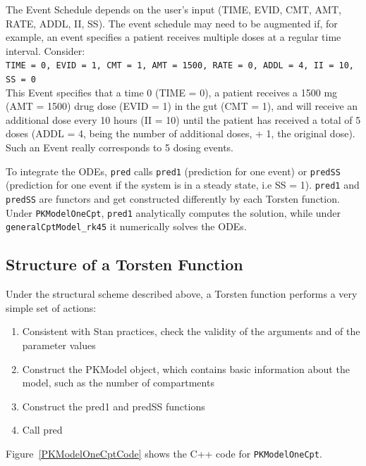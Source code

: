 \documentclass[11pt]{amsart}
\begin{document}
The Event Schedule depends on the user's input (TIME, EVID, CMT, AMT, RATE, ADDL, II, SS). The event schedule may need to be augmented if, for example, an event specifies a patient receives multiple doses at a regular time interval. Consider: \\

\texttt{TIME = 0, EVID = 1, CMT = 1, AMT = 1500, RATE = 0, ADDL = 4, II = 10, SS = 0} \\

This Event specifies that a time 0 (TIME = 0), a patient receives a 1500 mg (AMT = 1500) drug dose (EVID = 1) in the gut (CMT = 1), and will receive an additional dose every 10 hours (II = 10) until the patient has received a total of 5 doses (ADDL = 4, being the number of additional doses, + 1, the original dose). Such an Event really corresponds to 5 dosing events.

To integrate the ODEs, \texttt{pred} calls \texttt{pred1} (prediction for one event) or \texttt{predSS} (prediction for one event if the system is in a steady state, i.e SS = 1). \texttt{pred1} and \texttt{predSS} are functors and get constructed differently by each Torsten function. Under \texttt{PKModelOneCpt}, \texttt{pred1} analytically computes the solution, while under \texttt{generalCptModel\_rk45} it numerically solves the ODEs.
 
\subsection*{Structure of a Torsten Function} 
Under the structural scheme described above, a Torsten function performs a very simple set of actions:
\begin{enumerate}
  \item Consistent with Stan practices, check the validity of the arguments and of the parameter values
  \item Construct the PKModel object, which contains basic information about the model, such as the number of compartments
  \item Construct the pred1 and predSS functions
  \item Call pred
\end{enumerate}  

Figure~\ref{PKModelOneCptCode} shows the C++ code for \texttt{PKModelOneCpt}.
\end{document}
